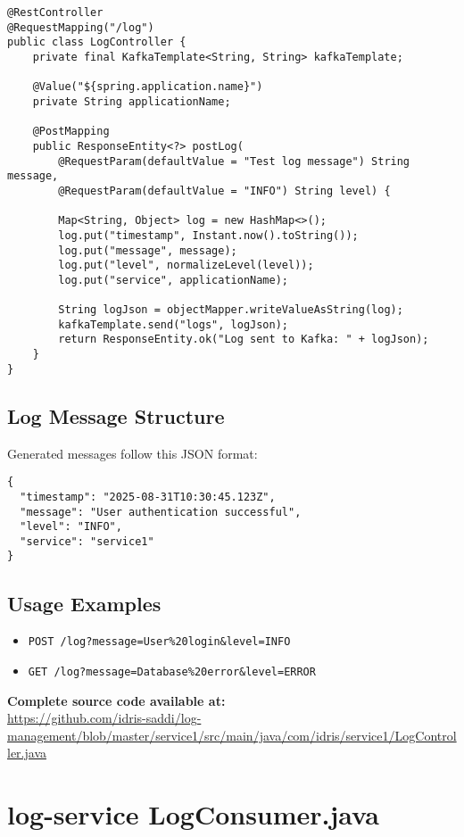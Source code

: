 \documentclass[12pt,a4paper]{report}
\begin{document}
\begin{Verbatim}[frame=single, fontsize=\scriptsize]
@RestController
@RequestMapping("/log")
public class LogController {
    private final KafkaTemplate<String, String> kafkaTemplate;
    
    @Value("${spring.application.name}")
    private String applicationName;

    @PostMapping
    public ResponseEntity<?> postLog(
        @RequestParam(defaultValue = "Test log message") String message,
        @RequestParam(defaultValue = "INFO") String level) {
        
        Map<String, Object> log = new HashMap<>();
        log.put("timestamp", Instant.now().toString());
        log.put("message", message);
        log.put("level", normalizeLevel(level));
        log.put("service", applicationName);

        String logJson = objectMapper.writeValueAsString(log);
        kafkaTemplate.send("logs", logJson);
        return ResponseEntity.ok("Log sent to Kafka: " + logJson);
    }
}
\end{Verbatim}

\section*{Log Message Structure}
Generated messages follow this JSON format:
\begin{Verbatim}[frame=single, fontsize=\scriptsize]
{
  "timestamp": "2025-08-31T10:30:45.123Z",
  "message": "User authentication successful",
  "level": "INFO",
  "service": "service1"
}
\end{Verbatim}

\section*{Usage Examples}
\begin{itemize}
\item \texttt{POST /log?message=User\%20login\&level=INFO}
\item \texttt{GET /log?message=Database\%20error\&level=ERROR}
\end{itemize}

\textbf{Complete source code available at:} \\
\url{https://github.com/idris-saddi/log-management/blob/master/service1/src/main/java/com/idris/service1/LogController.java}

\chapter{log-service LogConsumer.java}
\end{document}
